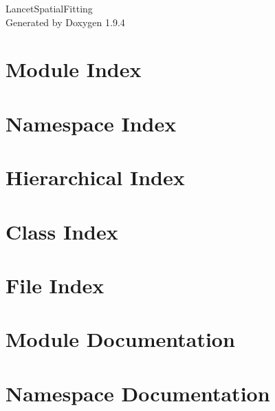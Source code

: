\documentclass[twoside]{book}
\newcommand{\+}{\discretionary{\mbox{\scriptsize$\hookleftarrow$}}{}{}}
\newcommand{\clearemptydoublepage}{%
    \newpage{\pagestyle{empty}\cleardoublepage}%
  }
\begin{document}
  \raggedbottom
    \hypersetup{pageanchor=false,
                bookmarksnumbered=true,
                pdfencoding=unicode
               }
  \begin{titlepage}
  \vspace*{7cm}
  \begin{center}%
  {\Large Lancet\+Spatial\+Fitting}\\
  \vspace*{1cm}
  {\large Generated by Doxygen 1.9.4}\\
  \end{center}
  \end{titlepage}
  \clearemptydoublepage
  \tableofcontents
  \clearemptydoublepage
  \hypersetup{pageanchor=true}
\chapter{Module Index}

\chapter{Namespace Index}

\chapter{Hierarchical Index}

\chapter{Class Index}

\chapter{File Index}

\chapter{Module Documentation}

\chapter{Namespace Documentation}


\end{document}
